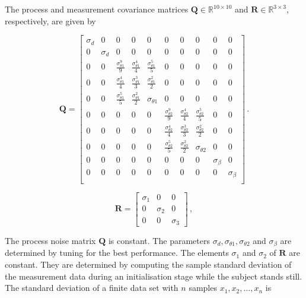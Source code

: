 The process and measurement covariance matrices $\mathbf{Q} \in \mathbb{R}^{10 \times 10}$ and $\mathbf{R} \in \mathbb{R}^{3 \times 3}$, respectively, are given by

\begin{equation}
\mathbf{Q} = \begin{bmatrix}
  \sigma_d & 0 & 0 & 0 & 0 & 0 & 0 & 0 & 0 & 0\\
  0 & \sigma_d & 0 & 0 & 0 & 0 & 0 & 0 & 0 & 0\\
  0 & 0 & \frac{\sigma^9_{\theta 1}}{9} & \frac{\sigma^4_{\theta 1}}{4} & \frac{\sigma^5_{\theta 1}}{5} & 0 & 0 & 0 & 0 & 0\\
  0 & 0 & \frac{\sigma^4_{\theta 1}}{4} & \frac{\sigma^3_{\theta 1}}{3} & \frac{\sigma^2_{\theta 1}}{2} & 0 & 0 & 0 & 0 & 0\\
  0 & 0 & \frac{\sigma^5_{\theta 1}}{5} & \frac{\sigma^2_{\theta 1}}{2} & \sigma_{\theta 1} & 0 & 0 & 0 & 0 & 0\\
  0 & 0 & 0 & 0 & 0 & \frac{\sigma^9_{\theta 2}}{9} & \frac{\sigma^4_{\theta 2}}{4} & \frac{\sigma^5_{\theta 2}}{5} & 0 & 0\\
  0 & 0 & 0 & 0 & 0 & \frac{\sigma^4_{\theta 2}}{4} & \frac{\sigma^3_{\theta 2}}{3} & \frac{\sigma^2_{\theta 2}}{2} & 0 & 0\\
  0 & 0 & 0 & 0 & 0 & \frac{\sigma^5_{\theta 2}}{5} & \frac{\sigma^2_{\theta 2}}{2} & \sigma_{\theta 2} & 0 & 0\\
  0 & 0 & 0 & 0 & 0 & 0 & 0 & 0 & \sigma_{\beta} & 0\\
  0 & 0 & 0 & 0 & 0 & 0 & 0 & 0 & 0 & \sigma_{\beta}\\
\end{bmatrix}\,.
\end{equation}

\begin{equation}
\mathbf{R} = \begin{bmatrix}
  \sigma_1 & 0 & 0\\
  0 & \sigma_2 & 0\\
  0 & 0 & \sigma_3
\end{bmatrix}\,,
\end{equation}

\noindent
The process noise matrix $\mathbf{Q}$ is constant. The parameters $\sigma_d, \sigma_{\theta 1}, \sigma_{\theta 2}$ and $\sigma_{\beta}$ are determined by tuning for the best performance. The elements $\sigma_1$ and $\sigma_2$ of $\mathbf{R}$ are constant. They are determined by computing the sample standard deviation of the measurement data during an initialisation stage while the subject stands still. The standard deviation of a finite data set with $n$ samples $x_1, x_2, \dots, x_n$ is

